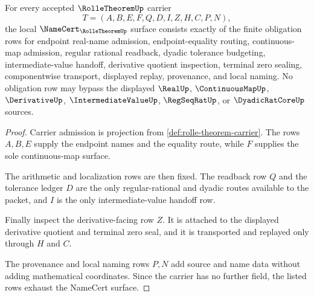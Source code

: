 \begin{theorem}
\label{thm:rolle-theorem-namecert-obligations}
For every accepted $\RolleTheoremUp$ carrier
$$
T=(A,B,E,F,Q,D,I,Z,H,C,P,N),
$$
the local $\NameCert_{\RolleTheoremUp}$ surface consists exactly of the finite obligation rows for endpoint real-name admission, endpoint-equality routing, continuous-map admission, regular rational readback, dyadic tolerance budgeting, intermediate-value handoff, derivative quotient inspection, terminal zero sealing, componentwise transport, displayed replay, provenance, and local naming. No obligation row may bypass the displayed $\RealUp$, $\ContinuousMapUp$, $\DerivativeUp$, $\IntermediateValueUp$, $\RegSeqRatUp$, or $\DyadicRatCoreUp$ sources.
\end{theorem}
\begin{proof}
Carrier admission is projection from \autoref{def:rolle-theorem-carrier}. The rows $A,B,E$ supply the endpoint names and the equality route, while $F$ supplies the sole continuous-map surface.

The arithmetic and localization rows are then fixed. The readback row $Q$ and the tolerance ledger $D$ are the only regular-rational and dyadic routes available to the packet, and $I$ is the only intermediate-value handoff row.

Finally inspect the derivative-facing row $Z$. It is attached to the displayed derivative quotient and terminal zero seal, and it is transported and replayed only through $H$ and $C$.

The provenance and local naming rows $P,N$ add source and name data without adding mathematical coordinates. Since the carrier has no further field, the listed rows exhaust the NameCert surface.
\end{proof}

